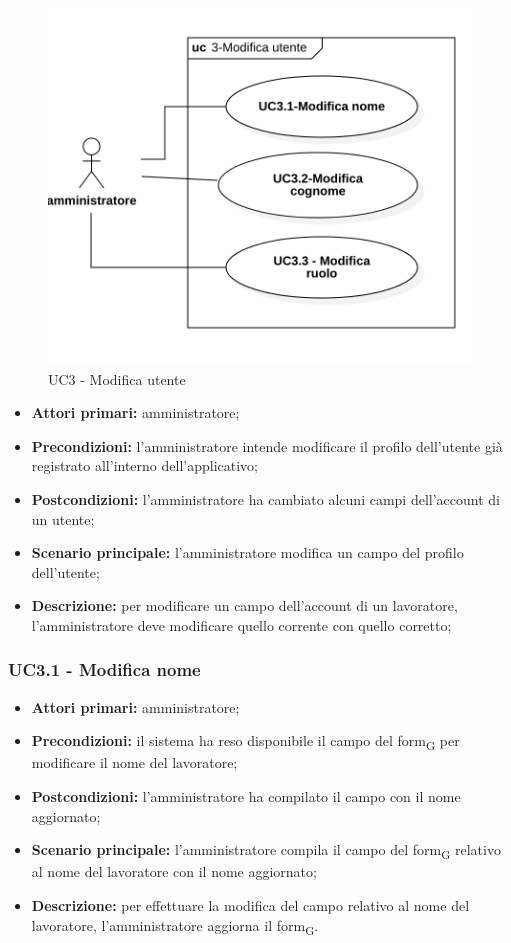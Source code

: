 \begin{figure}[H]
	\centering
	\includegraphics[scale=0.52]{res/images/uc3.png}
	\caption{UC3 - Modifica utente}
\end{figure}
\begin{itemize}
	\item 	\textbf{Attori primari:} amministratore;
	\item 	\textbf{Precondizioni:} l’amministratore intende modificare il profilo dell’utente già registrato all’interno dell’applicativo;
	\item 	\textbf{Postcondizioni:} l’amministratore ha cambiato alcuni campi dell’account di un utente;
	\item 	\textbf{Scenario principale:} l’amministratore modifica un campo del profilo dell’utente;
	\item 	\textbf{Descrizione:} per modificare un campo dell’account di un lavoratore, l’amministratore deve modificare quello corrente con quello corretto;

\end{itemize}

\subsubsection{UC3.1 - Modifica nome}

\begin{itemize}
	\item 	\textbf{Attori primari:} amministratore;
	\item 	\textbf{Precondizioni:} il sistema ha reso disponibile il campo del \gls{form}\textsubscript{G} per modificare il nome del lavoratore;
	\item 	\textbf{Postcondizioni:}  l’amministratore ha compilato il campo con il nome aggiornato;
	\item 	\textbf{Scenario principale:} l’amministratore compila il campo del \gls{form}\textsubscript{G} relativo al nome del lavoratore con il nome aggiornato;
	\item 	\textbf{Descrizione:} per effettuare la modifica del campo relativo al nome del lavoratore, l’amministratore aggiorna il \gls{form}\textsubscript{G}.
\end{itemize}

